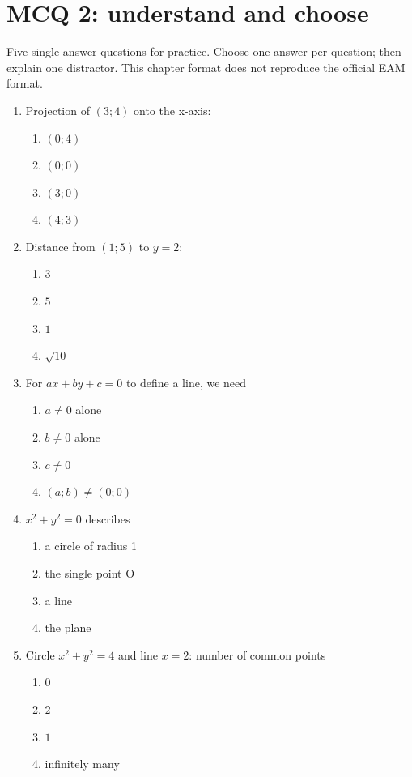 \endgroup
\begingroup\small
{}\section*{MCQ 2: understand and choose}\label{C07-Q2}
Five single-answer questions for practice. Choose one answer per question; then explain one distractor. This chapter format does not reproduce the official EAM format.
\begin{enumerate}
\item Projection of $(3;4)$ onto the x-axis:
\begin{enumerate}[label=\Alph*.,itemsep=2pt]
\item $(0;4)$
\item $(0;0)$
\item $(3;0)$
\item $(4;3)$
\end{enumerate}
\item Distance from $(1;5)$ to $y=2$:
\begin{enumerate}[label=\Alph*.,itemsep=2pt]
\item $3$
\item $5$
\item $1$
\item $\sqrt{10}$
\end{enumerate}
\item For $ax+by+c=0$ to define a line, we need
\begin{enumerate}[label=\Alph*.,itemsep=2pt]
\item $a\ne0$ alone
\item $b\ne0$ alone
\item $c\ne0$
\item $(a;b)\ne(0;0)$
\end{enumerate}
\item $x^2+y^2=0$ describes
\begin{enumerate}[label=\Alph*.,itemsep=2pt]
\item a circle of radius 1
\item the single point O
\item a line
\item the plane
\end{enumerate}
\item Circle $x^2+y^2=4$ and line $x=2$: number of common points
\begin{enumerate}[label=\Alph*.,itemsep=2pt]
\item $0$
\item $2$
\item $1$
\item infinitely many
\end{enumerate}
\end{enumerate}

